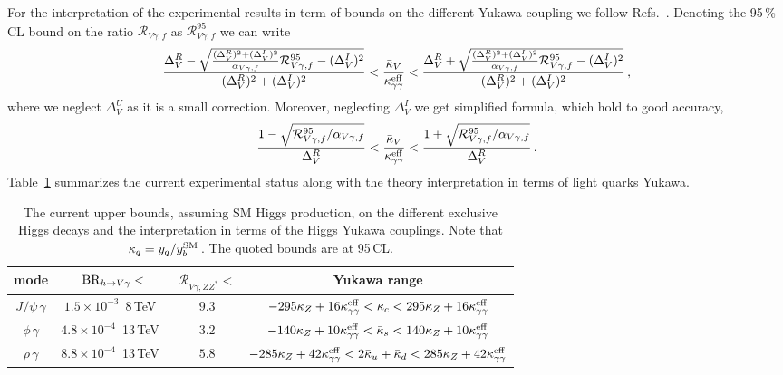 \documentclass[../report.tex]{subfiles}
\newcommand{\cR}{\mathcal{R}}
\begin{document}
For the interpretation of the experimental results in term of bounds on the different Yukawa coupling we follow Refs.~\cite{Perez:2015aoa,Perez:2015lra}. 
Denoting the 95\,\%\,CL bound on the ratio $\cR_{V\gamma,f}$ as $\cR_{V\gamma,f}^{95}$ we can write 
%
\begin{align}
	\frac{\Delta^R_V - \sqrt{  \frac{(\Delta^R_V)^2 + (\Delta^I_V)^2    }{\alpha_{V\gamma,f}} \cR_{V\gamma,f}^{95}   - (\Delta^I_V)^2 } }{ (\Delta^R_V)^2 + (\Delta^I_V)^2 } 
	< \frac{\bar{\kappa}_V}{\kappa^{\rm eff}_{\gamma\gamma}} < 
	\frac{\Delta^R_V + \sqrt{  \frac{(\Delta^R_V)^2 + (\Delta^I_V)^2    }{\alpha_{V\gamma,f}} \cR_{V\gamma,f}^{95}   - (\Delta^I_V)^2 } }{ (\Delta^R_V)^2 + (\Delta^I_V)^2 }  \, ,
\end{align}
%
where we neglect $\Delta^U_V$ as it is a small correction. 
Moreover, neglecting $\Delta^I_V$ we get simplified formula, which hold to good accuracy, 
%
\begin{align}
	\label{eq:Rsimp}
	\frac{1 - \sqrt{  \cR_{V\gamma,f}^{95}/\alpha_{V\gamma,f} } }{ \Delta^R_V} 
	< \frac{\bar{\kappa}_V}{\kappa^{\rm eff}_{\gamma\gamma}} < 
	\frac{1 + \sqrt{  \cR_{V\gamma,f}^{95}/\alpha_{V\gamma,f} } }{ \Delta^R_V}  \, .
\end{align}
%
Table~\ref{tab:hexclusive} summarizes the current experimental status along with the theory interpretation in terms of light quarks Yukawa.  
\begin{table}[t]
\begin{center}
\begin{tabular}{|c|c|c|c|}
\hline
mode & ${\rm BR}_{h\to V\gamma}<$ & $\cR_{V\gamma,ZZ^*}<$ &Yukawa range  \\
\hline\hline 
$J/\psi\,\gamma$  &
$1.5\times 10^{-3}$\, 8\,TeV~\cite{Aad:2015sda,Khachatryan:2015lga} & 
$9.3$ &
$-295\kappa_Z + 16\kappa^{\rm eff}_{\gamma\gamma} < \kappa_c < 295\kappa_Z + 16\kappa^{\rm eff}_{\gamma\gamma} $\\
\hline
$\phi\,\gamma$ &
$4.8 \times 10^{-4}$\, 13\,TeV~\cite{Aaboud:2016rug,Aaboud:2017xnb} & 
$3.2$ &
$-140\kappa_Z + 10\kappa^{\rm eff}_{\gamma\gamma} < \bar{\kappa}_s < 140\kappa_Z + 10\kappa^{\rm eff}_{\gamma\gamma} $\\
\hline
$\rho\,\gamma$ &
$8.8 \times 10^{-4}$\, 13\,TeV~\cite{Aaboud:2017xnb} & 
$5.8$ &
$-285\kappa_Z + 42\kappa^{\rm eff}_{\gamma\gamma} < 2\bar{\kappa}_u + \bar{\kappa}_d < 285\kappa_Z + 42\kappa^{\rm eff}_{\gamma\gamma} $\\
\hline\hline
\end{tabular}
\end{center}
\caption{The current upper bounds, assuming SM Higgs production, on the different exclusive Higgs decays and the interpretation in terms of the Higgs Yukawa couplings. Note that $\bar{\kappa}_q = y_q/y^{\rm SM}_b\,$. The quoted bounds are at 95\,CL. }
\label{tab:hexclusive}
\end{table}%
\end{document}

